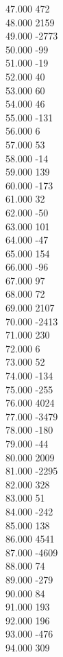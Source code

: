 { 47.000	472 \\
 48.000	2159 \\
 49.000	-2773 \\
 50.000	-99 \\
 51.000	-19 \\
 52.000	40 \\
 53.000	60 \\
 54.000	46 \\
 55.000	-131 \\
 56.000	6 \\
 57.000	53 \\
 58.000	-14 \\
 59.000	139 \\
 60.000	-173 \\
 61.000	32 \\
 62.000	-50 \\
 63.000	101 \\
 64.000	-47 \\
 65.000	154 \\
 66.000	-96 \\
 67.000	97 \\
 68.000	72 \\
 69.000	2107 \\
 70.000	-2413 \\
 71.000	230 \\
 72.000	6 \\
 73.000	52 \\
 74.000	-134 \\
 75.000	-255 \\
 76.000	4024 \\
 77.000	-3479 \\
 78.000	-180 \\
 79.000	-44 \\
 80.000	2009 \\
 81.000	-2295 \\
 82.000	328 \\
 83.000	51 \\
 84.000	-242 \\
 85.000	138 \\
 86.000	4541 \\
 87.000	-4609 \\
 88.000	74 \\
 89.000	-279 \\
 90.000	84 \\
 91.000	193 \\
 92.000	196 \\
 93.000	-476 \\
 94.000	309 \\
}
